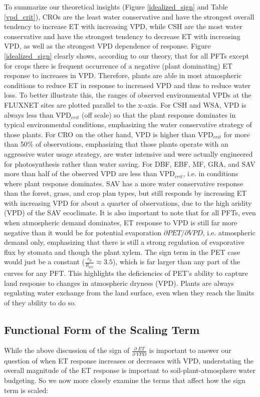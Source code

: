 \documentclass[draft,linenumbers]{afmjournal}
\begin{document}
To summarize our theoretical insights (Figure \ref{idealized_sign} and
Table \ref{vpd_crit}), CROs are the least water conservative and have
the strongest overall tendency to increase ET with increasing VPD,
while CSH are the most water conservative and have the strongest
tendency to decrease ET with increasing VPD, as well as the strongest
VPD dependence of response. Figure \ref{idealized_sign} clearly shows,
according to our theory, that for all PFTs except for crops there is
frequent occurrence of a negative (plant dominating) ET response to
increases in VPD. Therefore, plants are able in most atmospheric
conditions to reduce ET in response to increased VPD and thus to
reduce water loss. To better illustrate this, the ranges of observed
environmental VPDs at the FLUXNET sites are plotted parallel to the
x-axis. For CSH and WSA, VPD is always less than VPD$_{crit}$ (off scale) so
that the plant response dominates in typical environmental conditions,
emphasizing the water conservative strategy of those plants. For CRO
on the other hand, VPD is higher than VPD$_{crit}$ for more than 50\%
of observations, emphasizing that those plants operate with an
aggressive water usage strategy, are water intensive and were actually
engineered for photosynthesis rather than water saving. For DBF, EBF,
MF, GRA, and SAV more than half of the observed VPD are less than
VPD$_{crit}$, i.e. in conditions where plant response dominates. SAV
has a more water conservative response than the forest, grass, and
crop plan types, but still responds by increasing ET with increasing
VPD for about a quarter of observations, due to the high aridity (VPD)
of the SAV ecoclimate. It is also important to note that for all PFTs,
even when atmospheric demand dominates, ET response to VPD is still
far more negative than it would be for potential evaporation
$\partial PET/\partial VPD$, i.e. atmospheric demand only, emphasizing
that there is still a strong regulation of evaporative flux by stomata
and though the plant xylem. The sign term in the PET case would just
be a constant ($\frac{c_p}{R_{air}} \approx 3.5$), which is far larger
than any part of the curves for any PFT. This highlights the
deficiencies of PET's ability to capture land response to changes in
atmospheric dryness (VPD). Plants are always regulating water exchange
from the land surface, even when they reach the limits of they ability
to do so.

\subsection{Functional Form of the Scaling Term}
\label{scale_term}
While the above discussion of the sign of
$\frac{\partial \; ET}{\partial \; VPD}$ is important to answer our
question of when ET response increases or decreases with VPD,
understating the overall magnitude of the ET response is important to
soil-plant-atmosphere water budgeting. So we now more closely examine
the terms that affect how the sign term is scaled:
\end{document}
